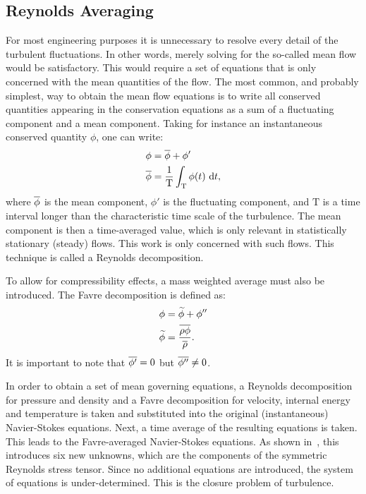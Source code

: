 \subsection{Reynolds Averaging}
\label{sec:introrans}
%
For most engineering purposes it is unnecessary to resolve every detail of the turbulent fluctuations. In other words, merely solving for the so-called mean flow would be satisfactory. This would require a set of equations that is only concerned with the mean quantities of the flow. The most common, and probably simplest, way to obtain the mean flow equations is to write all conserved quantities appearing in the conservation equations as a sum of a fluctuating component and a mean component. Taking for instance an instantaneous conserved quantity $\phi$, one can write:
\begin{align*}
    \phi &= \overline{\phi} + \phi'\\
    \overline{\phi} &= \frac{1}{\text{T}} \int_{\text{T}}\phi(t)
        ~\text{d}t,
\end{align*}
where $\overline{\phi}$ is the mean component, $\phi'$ is the fluctuating component, and $\text{T}$ is a time interval longer than the characteristic time scale of the turbulence. The mean component is then a time-averaged value, which is only relevant in statistically stationary (steady) flows. This work is only concerned with such flows. This technique is called a Reynolds decomposition.

To allow for compressibility effects, a mass weighted average must also be introduced. The Favre decomposition is defined as:
\begin{align*}
    \phi &= \widetilde{\phi} + \phi'' \\
    \widetilde{\phi} &= \frac{\overline{\rho\phi}}{\overline{\rho}}.
\end{align*}
It is important to note that $\overline{\phi'} = 0$ but $\overline{\phi''} \ne 0$.

In order to obtain a set of mean governing equations, a Reynolds decomposition for pressure and density and a Favre decomposition for velocity, internal energy and temperature is taken and substituted into the original (instantaneous) Navier-Stokes equations. Next, a time average of the resulting equations is taken. This leads to the Favre-averaged Navier-Stokes equations. As shown in~, this introduces six new unknowns, which are the components of the symmetric Reynolds stress tensor. Since no additional equations are introduced, the system of equations is under-determined. This is the closure problem of turbulence.

